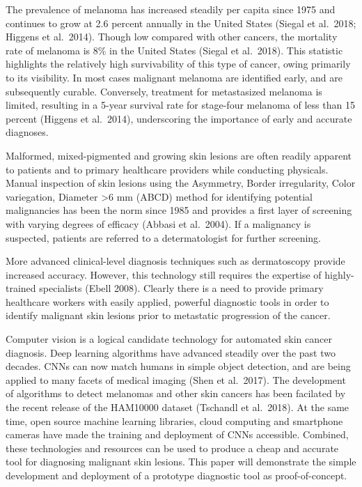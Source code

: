 \documentclass[11pt]{article}
\begin{document}
The prevalence of melanoma has increased steadily per capita since 1975
and continues to grow at 2.6 percent annually in the United States
(Siegal et al.~2018; Higgens et al.~2014). Though low compared with
other cancers, the mortality rate of melanoma is 8\% in the United
States (Siegal et al.~2018). This statistic highlights the relatively
high survivability of this type of cancer, owing primarily to its
visibility. In most cases malignant melanoma are identified early, and
are subsequently curable. Conversely, treatment for metastasized
melanoma is limited, resulting in a 5-year survival rate for stage-four
melanoma of less than 15 percent (Higgens et al.~2014), underscoring the
importance of early and accurate diagnoses.

Malformed, mixed-pigmented and growing skin lesions are often readily
apparent to patients and to primary healthcare providers while
conducting physicals. Manual inspection of skin lesions using the
Asymmetry, Border irregularity, Color variegation, Diameter
\textgreater{}6 mm (ABCD) method for identifying potential malignancies
has been the norm since 1985 and provides a first layer of screening
with varying degrees of efficacy (Abbasi et al.~2004). If a malignancy
is suspected, patients are referred to a determatologist for further
screening.

More advanced clinical-level diagnosis techniques such as dermatoscopy
provide increased accuracy. However, this technology still requires the
expertise of highly-trained specialists (Ebell 2008). Clearly there is a
need to provide primary healthcare workers with easily applied, powerful
diagnostic tools in order to identify malignant skin lesions prior to
metastatic progression of the cancer.

Computer vision is a logical candidate technology for automated skin
cancer diagnosis. Deep learning algorithms have advanced steadily over
the past two decades. CNNs can now match humans in simple object
detection, and are being applied to many facets of medical imaging (Shen
et al.~2017). The development of algorithms to detect melanomas and
other skin cancers has been facilated by the recent release of the
HAM10000 dataset (Tschandl et al.~2018). At the same time, open source
machine learning libraries, cloud computing and smartphone cameras have
made the training and deployment of CNNs accessible. Combined, these
technologies and resources can be used to produce a cheap and accurate
tool for diagnosing malignant skin lesions. This paper will demonstrate
the simple development and deployment of a prototype diagnostic tool as
proof-of-concept.
\end{document}
